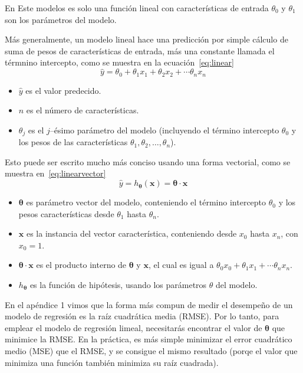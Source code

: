 En %
Este modelos es solo una función lineal con características de entrada %
$\theta_{0}$ y $\theta_{1}$ son los parámetros del modelo.

Más generalmente, un modelo lineal hace una predicción por simple cálculo de suma de pesos de características de entrada, más una constante llamada el térmnino intercepto, como se muestra en la ecuación~\eqref{eq:linear}
\begin{equation}\label{eq:linear}
\hat{y}=\theta_{0}+\theta_{1}x_{1}+\theta_{2}x_{2}+\cdots\theta_{n}x_{n}
\end{equation}
\begin{itemize}
	\item $\hat{y}$ es el valor predecido.
	\item $n$ es el número de características.
	\item $\theta_{j}$ es el $j$--ésimo parámetro del modelo (incluyendo el término intercepto $\theta_{0}$ y los pesos de las características $\theta_{1},\theta_{2},\ldots,\theta_{n}$).
\end{itemize}
Esto puede ser escrito mucho más conciso usando una forma vectorial, como se muestra en~\eqref{eq:linearvector}
\begin{equation}\label{eq:linearvector}
\hat{y}=h_{\bm{\theta}}\left(\bm{x}\right)=\bm{\theta}\cdot\bm{x}
\end{equation}
\begin{itemize}
	\item $\bm{\theta}$ es parámetro vector del modelo, conteniendo el término intercepto $\theta_{0}$ y los pesos características desde $\theta_{1}$ hasta $\theta_{n}$.
	\item $\bm{x}$ es la instancia del vector característica, conteniendo desde $x_{0}$ hasta $x_{n}$, con $x_{0}=1$.
	\item $\bm{\theta}\cdot\bm{x}$ es el producto interno de $\bm{\theta}$ y $\bm{x}$, el cual es igual a $\theta_{0}x_{0}+\theta_{1}x_{1}+\cdots\theta_{n}x_{n}$.
	\item $h_{\bm{\theta}}$ es la función de hipótesis, usando los parámetros $\theta$ del modelo.
\end{itemize}

En el apéndice 1
vimos que la forma más compun de medir el desempeño de un modelo de regresión es la raíz cuadrática media (RMSE). Por lo tanto, para emplear el modelo de regresión limeal, necesitarás encontrar el valor de $\bm{\theta}$ que minimice la RMSE. En la práctica, es más simple minimizar el error cuadrático medio (MSE) que el RMSE, y se consigue el mismo resultado (porqe el valor que minimiza una función también minimiza su raíz cuadrada).

